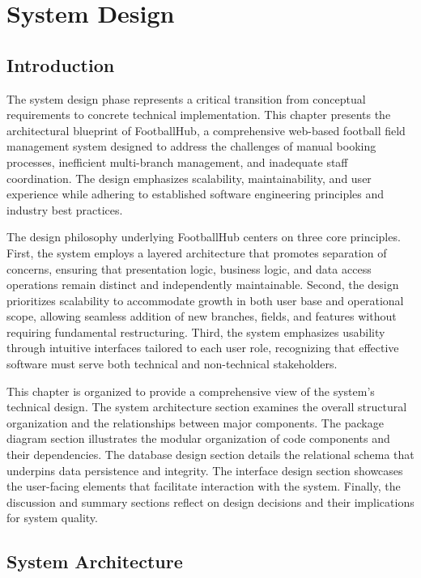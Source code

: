 \chapter{System Design}
\thispagestyle{empty}
\label{ch:5}

\section{Introduction}

The system design phase represents a critical transition from conceptual requirements to concrete technical implementation. This chapter presents the architectural blueprint of FootballHub, a comprehensive web-based football field management system designed to address the challenges of manual booking processes, inefficient multi-branch management, and inadequate staff coordination. The design emphasizes scalability, maintainability, and user experience while adhering to established software engineering principles and industry best practices.

The design philosophy underlying FootballHub centers on three core principles. First, the system employs a layered architecture that promotes separation of concerns, ensuring that presentation logic, business logic, and data access operations remain distinct and independently maintainable. Second, the design prioritizes scalability to accommodate growth in both user base and operational scope, allowing seamless addition of new branches, fields, and features without requiring fundamental restructuring. Third, the system emphasizes usability through intuitive interfaces tailored to each user role, recognizing that effective software must serve both technical and non-technical stakeholders.

This chapter is organized to provide a comprehensive view of the system's technical design. The system architecture section examines the overall structural organization and the relationships between major components. The package diagram section illustrates the modular organization of code components and their dependencies. The database design section details the relational schema that underpins data persistence and integrity. The interface design section showcases the user-facing elements that facilitate interaction with the system. Finally, the discussion and summary sections reflect on design decisions and their implications for system quality.

\section{System Architecture}

